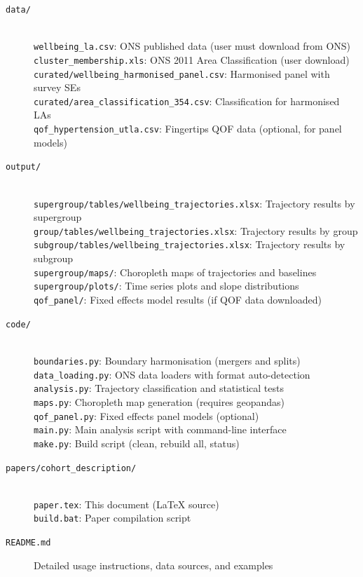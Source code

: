 \documentclass[12pt,a4paper]{article}
\begin{document}
\begin{description}
\item[\texttt{data/}] \hfill \\
\texttt{wellbeing\_la.csv}: ONS published data (user must download from ONS) \\
\texttt{cluster\_membership.xls}: ONS 2011 Area Classification (user download) \\
\texttt{curated/wellbeing\_harmonised\_panel.csv}: Harmonised panel with survey SEs \\
\texttt{curated/area\_classification\_354.csv}: Classification for harmonised LAs \\
\texttt{qof\_hypertension\_utla.csv}: Fingertips QOF data (optional, for panel models)

\item[\texttt{output/}] \hfill \\
\texttt{supergroup/tables/wellbeing\_trajectories.xlsx}: Trajectory results by supergroup \\
\texttt{group/tables/wellbeing\_trajectories.xlsx}: Trajectory results by group \\
\texttt{subgroup/tables/wellbeing\_trajectories.xlsx}: Trajectory results by subgroup \\
\texttt{supergroup/maps/}: Choropleth maps of trajectories and baselines \\
\texttt{supergroup/plots/}: Time series plots and slope distributions \\
\texttt{qof\_panel/}: Fixed effects model results (if QOF data downloaded)

\item[\texttt{code/}] \hfill \\
\texttt{boundaries.py}: Boundary harmonisation (mergers and splits) \\
\texttt{data\_loading.py}: ONS data loaders with format auto-detection \\
\texttt{analysis.py}: Trajectory classification and statistical tests \\
\texttt{maps.py}: Choropleth map generation (requires geopandas) \\
\texttt{qof\_panel.py}: Fixed effects panel models (optional) \\
\texttt{main.py}: Main analysis script with command-line interface \\
\texttt{make.py}: Build script (clean, rebuild all, status)

\item[\texttt{papers/cohort\_description/}] \hfill \\
\texttt{paper.tex}: This document (LaTeX source) \\
\texttt{build.bat}: Paper compilation script

\item[\texttt{README.md}] Detailed usage instructions, data sources, and examples
\end{description}
\end{document}
